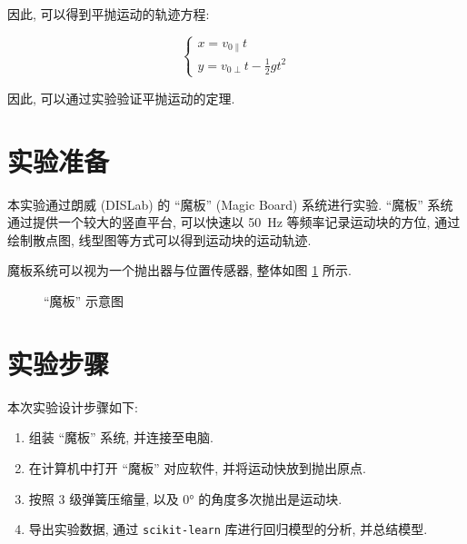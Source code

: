 \documentclass{article}
\begin{document}
因此, 可以得到平抛运动的轨迹方程:

\begin{equation}
    \begin{cases}
        x = v_{0\parallel}t \\
        y = v_{0\perp}t - \frac{1}{2}gt^2
    \end{cases}
\end{equation}

因此, 可以通过实验验证平抛运动的定理.

\section{实验准备}

本实验通过朗威 (DISLab) 的 ``魔板'' (Magic Board) 系统进行实验. ``魔板'' 系统通过提供一个较大的竖直平台, 可以快速以 \qty{50}{\hertz} 等频率记录运动块的方位, 通过绘制散点图, 线型图等方式可以得到运动块的运动轨迹.

魔板系统可以视为一个抛出器与位置传感器, 整体如图 \ref{fig:magic-board} 所示.

\begin{figure}[H]
    \centering
    \caption{``魔板'' 示意图}
    \label{fig:magic-board}
\end{figure}

\section{实验步骤}

本次实验设计步骤如下:

\begin{enumerate}
    \item 组装 ``魔板'' 系统, 并连接至电脑.
    \item 在计算机中打开 ``魔板'' 对应软件, 并将运动快放到抛出原点.
    \item 按照 $3$ 级弹簧压缩量, 以及 \ang{0} 的角度多次抛出是运动块.
    \item 导出实验数据, 通过 \texttt{scikit-learn} 库进行回归模型的分析, 并总结模型.
\end{enumerate}
\end{document}
